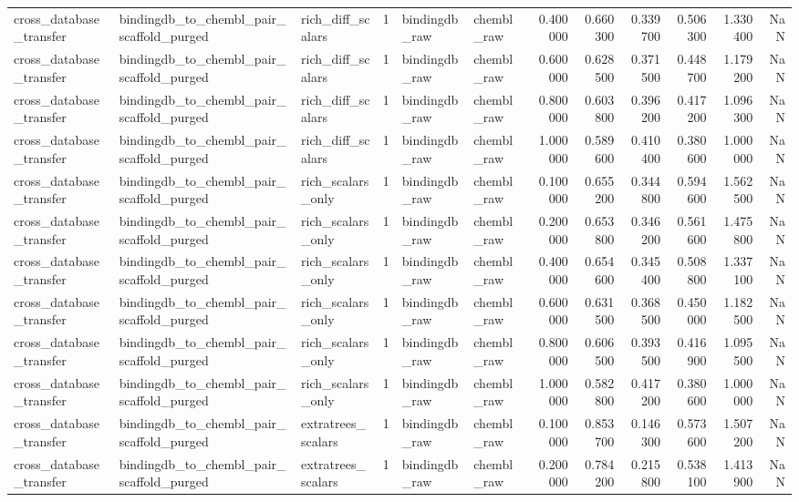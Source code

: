 \begin{longtable}{lllrllrrrrrr}
cross\_database\_transfer & bindingdb\_to\_chembl\_pair\_scaffold\_purged & rich\_diff\_scalars & 1 & bindingdb\_raw & chembl\_raw & 0.400000 & 0.660300 & 0.339700 & 0.506300 & 1.330400 & NaN \\
cross\_database\_transfer & bindingdb\_to\_chembl\_pair\_scaffold\_purged & rich\_diff\_scalars & 1 & bindingdb\_raw & chembl\_raw & 0.600000 & 0.628500 & 0.371500 & 0.448700 & 1.179200 & NaN \\
cross\_database\_transfer & bindingdb\_to\_chembl\_pair\_scaffold\_purged & rich\_diff\_scalars & 1 & bindingdb\_raw & chembl\_raw & 0.800000 & 0.603800 & 0.396200 & 0.417200 & 1.096300 & NaN \\
cross\_database\_transfer & bindingdb\_to\_chembl\_pair\_scaffold\_purged & rich\_diff\_scalars & 1 & bindingdb\_raw & chembl\_raw & 1.000000 & 0.589600 & 0.410400 & 0.380600 & 1.000000 & NaN \\
cross\_database\_transfer & bindingdb\_to\_chembl\_pair\_scaffold\_purged & rich\_scalars\_only & 1 & bindingdb\_raw & chembl\_raw & 0.100000 & 0.655200 & 0.344800 & 0.594600 & 1.562500 & NaN \\
cross\_database\_transfer & bindingdb\_to\_chembl\_pair\_scaffold\_purged & rich\_scalars\_only & 1 & bindingdb\_raw & chembl\_raw & 0.200000 & 0.653800 & 0.346200 & 0.561600 & 1.475800 & NaN \\
cross\_database\_transfer & bindingdb\_to\_chembl\_pair\_scaffold\_purged & rich\_scalars\_only & 1 & bindingdb\_raw & chembl\_raw & 0.400000 & 0.654600 & 0.345400 & 0.508800 & 1.337100 & NaN \\
cross\_database\_transfer & bindingdb\_to\_chembl\_pair\_scaffold\_purged & rich\_scalars\_only & 1 & bindingdb\_raw & chembl\_raw & 0.600000 & 0.631500 & 0.368500 & 0.450000 & 1.182500 & NaN \\
cross\_database\_transfer & bindingdb\_to\_chembl\_pair\_scaffold\_purged & rich\_scalars\_only & 1 & bindingdb\_raw & chembl\_raw & 0.800000 & 0.606500 & 0.393500 & 0.416900 & 1.095500 & NaN \\
cross\_database\_transfer & bindingdb\_to\_chembl\_pair\_scaffold\_purged & rich\_scalars\_only & 1 & bindingdb\_raw & chembl\_raw & 1.000000 & 0.582800 & 0.417200 & 0.380600 & 1.000000 & NaN \\
cross\_database\_transfer & bindingdb\_to\_chembl\_pair\_scaffold\_purged & extratrees\_scalars & 1 & bindingdb\_raw & chembl\_raw & 0.100000 & 0.853700 & 0.146300 & 0.573600 & 1.507200 & NaN \\
cross\_database\_transfer & bindingdb\_to\_chembl\_pair\_scaffold\_purged & extratrees\_scalars & 1 & bindingdb\_raw & chembl\_raw & 0.200000 & 0.784200 & 0.215800 & 0.538100 & 1.413900 & NaN \\

\end{longtable}
